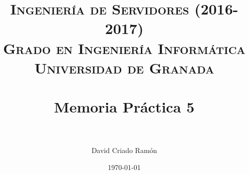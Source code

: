 



\title{	
\normalfont \normalsize 
\textsc{\textbf{Ingeniería de Servidores (2016-2017)} \\ Grado en Ingeniería Informática \\ Universidad de Granada} \\ [25pt] %
\horrule{0.5pt} \\[0.4cm] %
\huge Memoria Práctica 5 \\ %
\horrule{2pt} \\[0.5cm] %
}

\author{David Criado Ramón} %

\date{\normalsize\today} %








\maketitle %

\newpage %

\tableofcontents %

\listoffigures

\listoftables

\newpage
